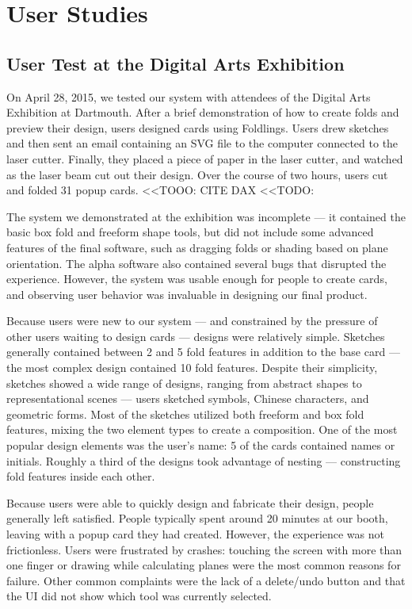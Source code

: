 \chapter{User Studies}

\section{User Test at the Digital Arts
Exhibition}\label{user-test-at-the-digital-arts-exhibition}

On April 28, 2015, we tested our system with attendees of the Digital
Arts Exhibition at Dartmouth. After a brief demonstration of how to
create folds and preview their design, users designed cards using
Foldlings. Users drew sketches and then sent an email containing an SVG
file to the computer connected to the laser cutter. Finally, they placed
a piece of paper in the laser cutter, and watched as the laser beam cut
out their design. Over the course of two hours, users cut and folded 31
popup cards. \textless{}\textless{}TOOO: CITE DAX
\textless{}\textless{}TODO:

The system we demonstrated at the exhibition was incomplete --- it
contained the basic box fold and freeform shape tools, but did not
include some advanced features of the final software, such as dragging
folds or shading based on plane orientation. The alpha software also
contained several bugs that disrupted the experience. However, the
system was usable enough for people to create cards, and observing user
behavior was invaluable in designing our final product.

Because users were new to our system --- and constrained by the pressure
of other users waiting to design cards --- designs were relatively
simple. Sketches generally contained between 2 and 5 fold features in
addition to the base card --- the most complex design contained 10 fold
features. Despite their simplicity, sketches showed a wide range of
designs, ranging from abstract shapes to representational scenes ---
users sketched symbols, Chinese characters, and geometric forms. Most of
the sketches utilized both freeform and box fold features, mixing the
two element types to create a composition. One of the most popular
design elements was the user's name: 5 of the cards contained names or
initials. Roughly a third of the designs took advantage of nesting ---
constructing fold features inside each other.

Because users were able to quickly design and fabricate their design,
people generally left satisfied. People typically spent around 20
minutes at our booth, leaving with a popup card they had created.
However, the experience was not frictionless. Users were frustrated by
crashes: touching the screen with more than one finger or drawing while
calculating planes were the most common reasons for failure. Other
common complaints were the lack of a delete/undo button and that the UI
did not show which tool was currently selected.

